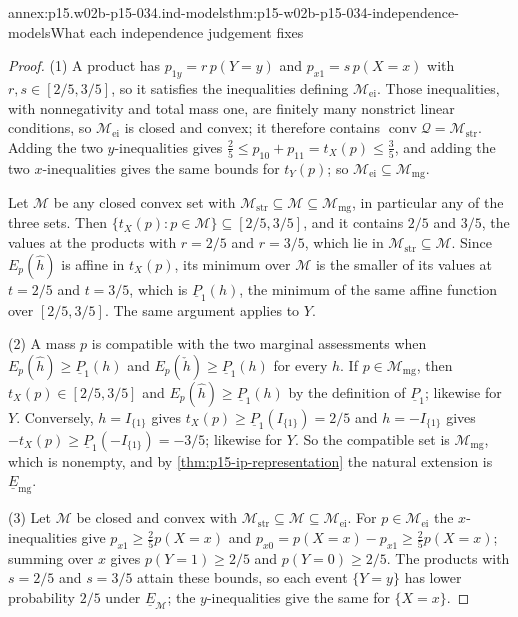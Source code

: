 \begin{annexitem}{annex:p15.w02b-p15-034.ind-models}{thm:p15-w02b-p15-034-independence-models}{What each independence judgement fixes}
\begin{proof}
(1) A product has \(p_{1y}=r\,p(Y{=}y)\) and \(p_{x1}=s\,p(X{=}x)\) with
\(r,s\in[2/5,3/5]\), so it satisfies the inequalities defining
\(\mathcal M_{\mathrm{ei}}\). Those inequalities, with nonnegativity and
total mass one, are finitely many nonstrict linear conditions, so
\(\mathcal M_{\mathrm{ei}}\) is closed and convex; it therefore contains
\(\operatorname{conv}\mathcal Q=\mathcal M_{\mathrm{str}}\). Adding the two
\(y\)-inequalities gives
\(\tfrac25\leq p_{10}+p_{11}=t_X(p)\leq\tfrac35\), and adding the two
\(x\)-inequalities gives the same bounds for \(t_Y(p)\); so
\(\mathcal M_{\mathrm{ei}}\subseteq\mathcal M_{\mathrm{mg}}\).

Let \(\mathcal M\) be any closed convex set with
\(\mathcal M_{\mathrm{str}}\subseteq\mathcal M\subseteq\mathcal M_{\mathrm{mg}}\),
in particular any of the three sets. Then
\(\{t_X(p):p\in\mathcal M\}\subseteq[2/5,3/5]\), and it contains \(2/5\)
and \(3/5\), the values at the products with \(r=2/5\) and \(r=3/5\),
which lie in \(\mathcal M_{\mathrm{str}}\subseteq\mathcal M\). Since
\(E_p(\hat h)\) is affine in \(t_X(p)\), its minimum over \(\mathcal M\)
is the smaller of its values at \(t=2/5\) and \(t=3/5\), which is
\(\underline P_1(h)\), the minimum of the same affine function over
\([2/5,3/5]\). The same argument applies to \(Y\).

(2) A mass \(p\) is compatible with the two marginal assessments when
\(E_p(\hat h)\geq\underline P_1(h)\) and
\(E_p(\check h)\geq\underline P_1(h)\) for every \(h\). If
\(p\in\mathcal M_{\mathrm{mg}}\), then \(t_X(p)\in[2/5,3/5]\) and
\(E_p(\hat h)\geq\underline P_1(h)\) by the definition of
\(\underline P_1\); likewise for \(Y\). Conversely, \(h=I_{\{1\}}\) gives
\(t_X(p)\geq\underline P_1(I_{\{1\}})=2/5\) and \(h=-I_{\{1\}}\) gives
\(-t_X(p)\geq\underline P_1(-I_{\{1\}})=-3/5\); likewise for \(Y\). So the
compatible set is \(\mathcal M_{\mathrm{mg}}\), which is nonempty, and by
\cref{thm:p15-ip-representation} the natural extension is
\(\underline E_{\mathrm{mg}}\).

(3) Let \(\mathcal M\) be closed and convex with
\(\mathcal M_{\mathrm{str}}\subseteq\mathcal M\subseteq\mathcal M_{\mathrm{ei}}\).
For \(p\in\mathcal M_{\mathrm{ei}}\) the \(x\)-inequalities give
\(p_{x1}\geq\tfrac25p(X{=}x)\) and
\(p_{x0}=p(X{=}x)-p_{x1}\geq\tfrac25p(X{=}x)\); summing over \(x\) gives
\(p(Y{=}1)\geq2/5\) and \(p(Y{=}0)\geq2/5\). The products with
\(s=2/5\) and \(s=3/5\) attain these bounds, so each event \(\{Y=y\}\) has
lower probability \(2/5\) under \(\underline E_{\mathcal M}\); the
\(y\)-inequalities give the same for \(\{X=x\}\).


\end{proof}
\end{annexitem}
